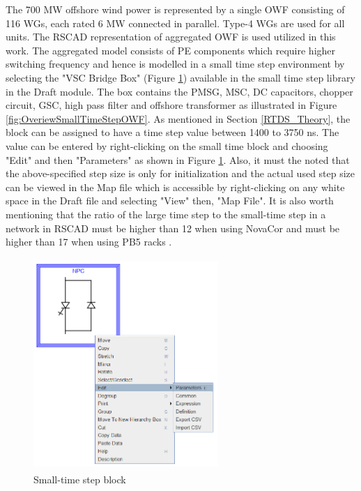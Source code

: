 The 700 MW offshore wind power is represented by a single \gls{OWF} consisting of 116 \gls{WG}s, each rated 6 MW connected in parallel. Type-4 \gls{WG}s are used for all units. The RSCAD representation of aggregated \gls{OWF} is used utilized in this work. The aggregated model consists of \gls{PE} components which require higher switching frequency %
and hence is modelled in a small time step environment by selecting the "VSC Bridge Box" (Figure \ref{fig:SmallTimeStepBlock}) available in the small time step library in the Draft module. The box contains the \gls{PMSG}, \gls{MSC}, \gls{DC} capacitors, chopper circuit, \gls{GSC}, high pass filter and offshore transformer as illustrated in Figure \ref{fig:OveriewSmallTimeStepOWF}. As mentioned in Section \ref{RTDS_Theory}, the block can be assigned to have a time step value between 1400 to 3750 ns. 
The value can be entered by right-clicking on the small time block and choosing "Edit" and then "Parameters" as shown in Figure \ref{fig:SmallTimeStepBlock}. Also, it must the noted that the above-specified step size is only for initialization and the actual used step size can be viewed in the Map file which is accessible by right-clicking on any white space in the Draft file and selecting "View" then, "Map File". It is also worth mentioning that the ratio of the large time step to the small-time step in a network in RSCAD must be higher than 12 when using NovaCor and must be higher than 17 when using PB5 racks \cite{rtds_tech}. 

\begin{figure}[H]
\centering
    \includegraphics[height = 8cm,width = 7cm]{Diagrams/Chapter_3/SmallTimeStepBlock.PNG}
    \caption{Small-time step block}
    \label{fig:SmallTimeStepBlock}
\end{figure}

